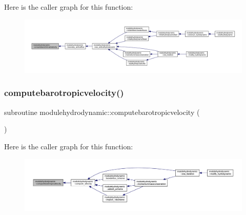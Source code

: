 Here is the caller graph for this function\+:\nopagebreak
\begin{figure}[H]
\begin{center}
\leavevmode
\includegraphics[width=350pt]{namespacemodulehydrodynamic_a1d49415947b89ef0be84e9bdfbad90a0_icgraph}
\end{center}
\end{figure}
\mbox{\label{namespacemodulehydrodynamic_a4ced11a2f90a07418b9497e7e9b068b7}} 
\subsubsection{\texorpdfstring{computebarotropicvelocity()}{computebarotropicvelocity()}}
{\footnotesize\ttfamily subroutine modulehydrodynamic\+::computebarotropicvelocity (\begin{DoxyParamCaption}{ }\end{DoxyParamCaption})\hspace{0.3cm}{\ttfamily [private]}}

Here is the caller graph for this function\+:\nopagebreak
\begin{figure}[H]
\begin{center}
\leavevmode
\includegraphics[width=350pt]{namespacemodulehydrodynamic_a4ced11a2f90a07418b9497e7e9b068b7_icgraph}
\end{center}
\end{figure}
\mbox{\label{namespacemodulehydrodynamic_a7eac8d5b6aff29b714f987f3bedd3a6a}} 
